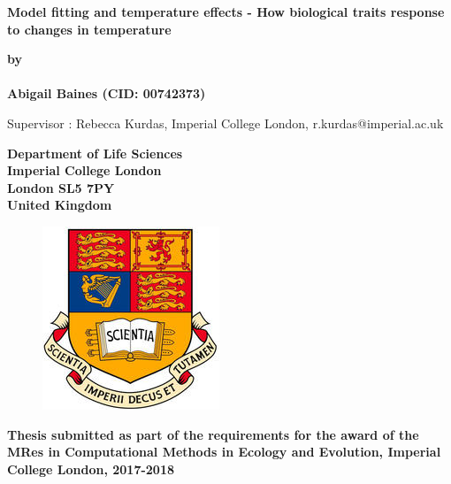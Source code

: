 \thispagestyle{empty}
\null\vskip0.2in%
\begin{center}
\LARGE{{\bf Model fitting and 
temperature effects - How 
biological traits response to changes
in temperature
}}
\end{center}

\vspace{0.5cm}

\begin{center}
{\Large {\bf by}}\\
\mbox{} \\
{\Large {\bf Abigail Baines (CID: 00742373)}}

{\Large Supervisor : Rebecca Kurdas, Imperial College London, r.kurdas@imperial.ac.uk}
\end{center}

\vspace{1cm}

\begin{center}
\large{\bf{Department of Life Sciences \\ Imperial College London \\
London SL5 7PY \\ United Kingdom}}
\end{center}


\vspace{1.5cm}

\begin{figure}[!h]
\centering
\includegraphics{crest.jpg}
\end{figure}

\vspace{1.5cm}

\begin{center}
\large{\bf{Thesis submitted as part of the requirements for the award of the \\
MRes in Computational Methods in Ecology and Evolution, Imperial College London, 2017-2018}}
\end{center}

\vspace{2cm}

